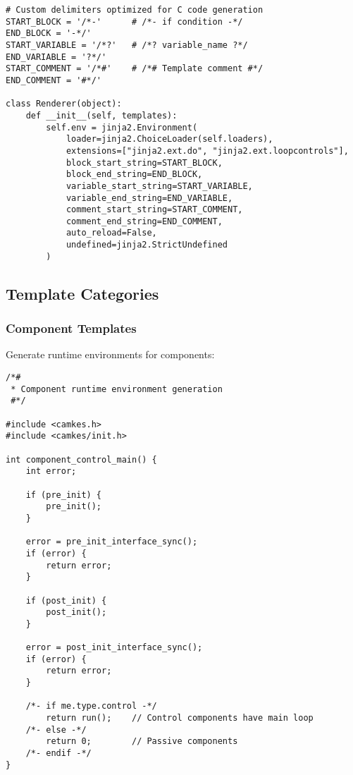 \documentclass[12pt,a4paper]{article}
\begin{document}

\begin{lstlisting}[style=python]
# Custom delimiters optimized for C code generation
START_BLOCK = '/*-'      # /*- if condition -*/ 
END_BLOCK = '-*/'
START_VARIABLE = '/*?'   # /*? variable_name ?*/
END_VARIABLE = '?*/'
START_COMMENT = '/*#'    # /*# Template comment #*/
END_COMMENT = '#*/'

class Renderer(object):
    def __init__(self, templates):
        self.env = jinja2.Environment(
            loader=jinja2.ChoiceLoader(self.loaders),
            extensions=["jinja2.ext.do", "jinja2.ext.loopcontrols"],
            block_start_string=START_BLOCK,
            block_end_string=END_BLOCK,
            variable_start_string=START_VARIABLE,
            variable_end_string=END_VARIABLE,
            comment_start_string=START_COMMENT,
            comment_end_string=END_COMMENT,
            auto_reload=False,
            undefined=jinja2.StrictUndefined
        )
\end{lstlisting}

\subsection{Template Categories}

\subsubsection{Component Templates}
Generate runtime environments for components:


\begin{lstlisting}[style=camkes]
/*#
 * Component runtime environment generation
 #*/

#include <camkes.h>
#include <camkes/init.h>

int component_control_main() {
    int error;

    if (pre_init) {
        pre_init();
    }

    error = pre_init_interface_sync();
    if (error) {
        return error;
    }

    if (post_init) {
        post_init();
    }

    error = post_init_interface_sync();
    if (error) {
        return error;
    }

    /*- if me.type.control -*/
        return run();    // Control components have main loop
    /*- else -*/
        return 0;        // Passive components
    /*- endif -*/
}
\end{lstlisting}
\end{document}
